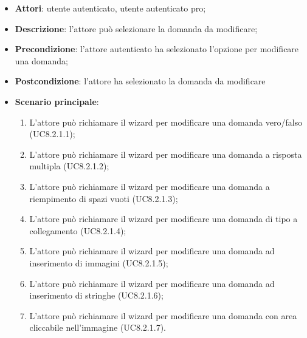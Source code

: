 		\begin{itemize}
			\item \textbf{Attori}: utente autenticato, utente autenticato pro;
			\item \textbf{Descrizione}: l'attore può selezionare la domanda da modificare;
			\item \textbf{Precondizione}: l'attore autenticato ha selezionato l'opzione per modificare una domanda;
			\item \textbf{Postcondizione}: l'attore ha selezionato la domanda da modificare 
			\item \textbf{Scenario principale}: 
					\begin{enumerate}
					\item
					L'attore può richiamare il wizard per modificare una domanda vero/falso (UC8.2.1.1);
					\item
					L'attore può richiamare il wizard per modificare una domanda a risposta multipla (UC8.2.1.2);
					\item
					L'attore può richiamare il wizard per modificare una domanda a riempimento di spazi vuoti (UC8.2.1.3);
					\item
					L'attore può richiamare il wizard per modificare una domanda di tipo a collegamento (UC8.2.1.4);
					\item
					L'attore può richiamare il wizard per modificare una domanda ad inserimento di immagini (UC8.2.1.5);
					\item
					L'attore può richiamare il wizard per modificare una domanda ad inserimento di stringhe (UC8.2.1.6);
					\item
					L'attore può richiamare il wizard per modificare una domanda con area cliccabile nell'immagine (UC8.2.1.7).
	 			\end{enumerate}
			
		\end{itemize}










